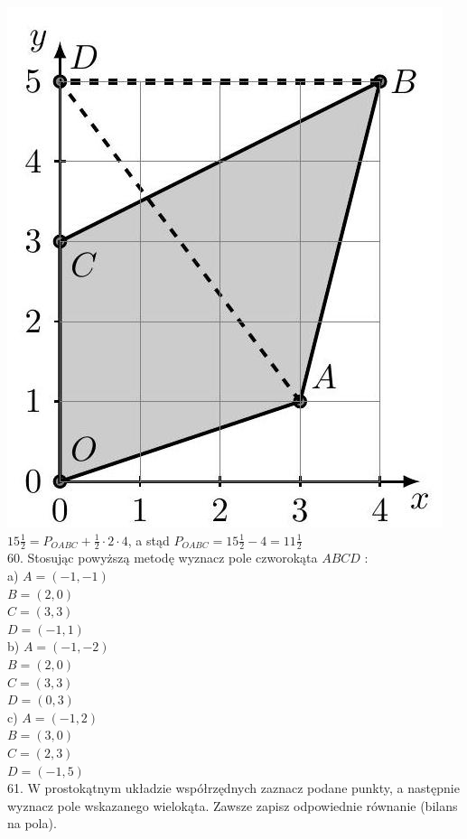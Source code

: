 \documentclass[10pt]{article}
\begin{document}
\includegraphics[max width=\textwidth, center]{2024_11_21_8f01584889ff06348ae7g-207}\\
\(15 \frac{1}{2}=P_{O A B C}+\frac{1}{2} \cdot 2 \cdot 4\), a stąd \(P_{O A B C}=15 \frac{1}{2}-4=11 \frac{1}{2}\)\\
60. Stosując powyższą metodę wyznacz pole czworokąta \(A B C D\) :\\
a) \(A=(-1,-1)\)\\
\(B=(2,0)\)\\
\(C=(3,3)\)\\
\(D=(-1,1)\)\\
b) \(A=(-1,-2)\)\\
\(B=(2,0)\)\\
\(C=(3,3)\)\\
\(D=(0,3)\)\\
c) \(A=(-1,2)\)\\
\(B=(3,0)\)\\
\(C=(2,3)\)\\
\(D=(-1,5)\)\\
61. W prostokątnym układzie współrzędnych zaznacz podane punkty, a następnie wyznacz pole wskazanego wielokąta. Zawsze zapisz odpowiednie równanie (bilans na pola).\\
\end{document}
